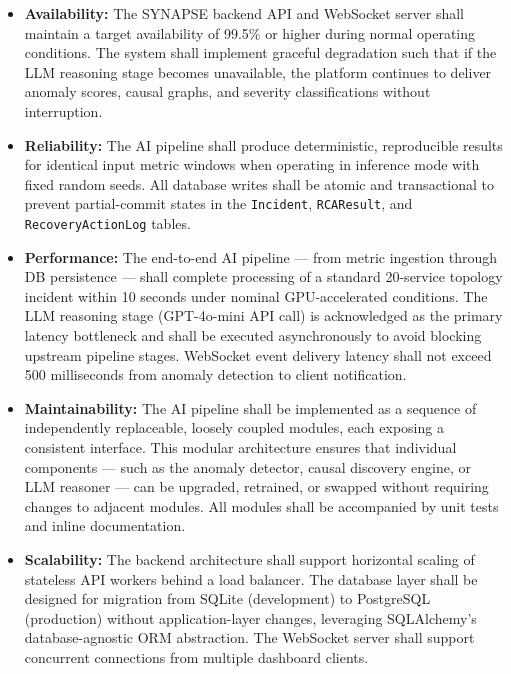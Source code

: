 \begin{itemize}

    \item \textbf{Availability:} The SYNAPSE backend API and WebSocket server shall maintain a target availability of 99.5\% or higher during normal operating conditions. The system shall implement graceful degradation such that if the LLM reasoning stage becomes unavailable, the platform continues to deliver anomaly scores, causal graphs, and severity classifications without interruption.

    \item \textbf{Reliability:} The AI pipeline shall produce deterministic, reproducible results for identical input metric windows when operating in inference mode with fixed random seeds. All database writes shall be atomic and transactional to prevent partial-commit states in the \texttt{Incident}, \texttt{RCAResult}, and \texttt{RecoveryActionLog} tables.

    \item \textbf{Performance:} The end-to-end AI pipeline — from metric ingestion through DB persistence — shall complete processing of a standard 20-service topology incident within 10 seconds under nominal GPU-accelerated conditions. The LLM reasoning stage (GPT-4o-mini API call) is acknowledged as the primary latency bottleneck and shall be executed asynchronously to avoid blocking upstream pipeline stages. WebSocket event delivery latency shall not exceed 500 milliseconds from anomaly detection to client notification.

    \item \textbf{Maintainability:} The AI pipeline shall be implemented as a sequence of independently replaceable, loosely coupled modules, each exposing a consistent interface. This modular architecture ensures that individual components — such as the anomaly detector, causal discovery engine, or LLM reasoner — can be upgraded, retrained, or swapped without requiring changes to adjacent modules. All modules shall be accompanied by unit tests and inline documentation.

    \item \textbf{Scalability:} The backend architecture shall support horizontal scaling of stateless API workers behind a load balancer. The database layer shall be designed for migration from SQLite (development) to PostgreSQL (production) without application-layer changes, leveraging SQLAlchemy's database-agnostic ORM abstraction. The WebSocket server shall support concurrent connections from multiple dashboard clients.


\end{itemize}

